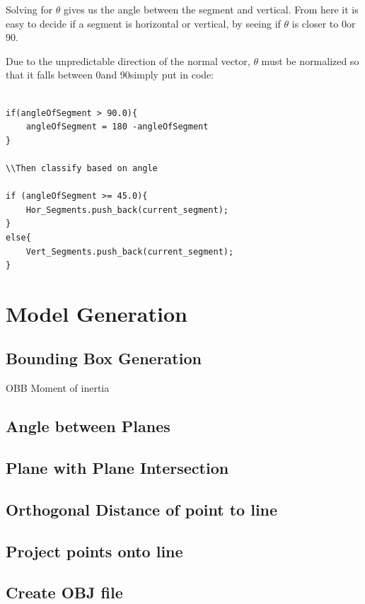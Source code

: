 				Solving for $\theta$ gives us the angle between the segment and vertical. From here it is easy to decide if a segment is horizontal or vertical, by seeing if $\theta$ is closer to 0\textdegree or 90\textdegree.
				
				Due to the unpredictable direction of the normal vector, $\theta$ must be normalized so that it falls between 0\textdegree and 90\textdegree simply put in code:\\
				

\begin{lstlisting}

if(angleOfSegment > 90.0){
	angleOfSegment = 180 -angleOfSegment
}

\\Then classify based on angle

if (angleOfSegment >= 45.0){
	Hor_Segments.push_back(current_segment);
}
else{
	Vert_Segments.push_back(current_segment);
} 
\end{lstlisting}



\section{Model Generation}
		\subsection{Bounding Box Generation}
		OBB
		Moment of inertia
		
		\subsection{Angle between Planes}
		
		\subsection{Plane with Plane Intersection}
		
		\subsection{Orthogonal Distance of point to line}
		
		\subsection{Project points onto line}
		
		\subsection{Create OBJ file}

	


